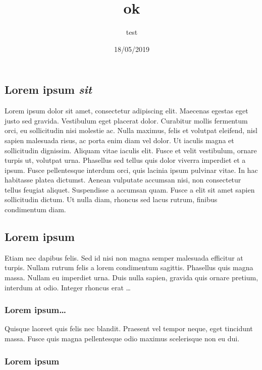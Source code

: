 \author{test}
\title{ok}
\date{18/05/2019}

\begin{pdf}
\maketitle

\section{Lorem ipsum \textit{sit}}

Lorem ipsum dolor sit amet, consectetur adipiscing elit. Maecenas egestas eget justo sed gravida. Vestibulum eget placerat dolor. Curabitur mollis fermentum orci, eu sollicitudin nisi molestie ac. Nulla maximus, felis et volutpat eleifend, nisl sapien malesuada risus, ac porta enim diam vel dolor. Ut iaculis magna et sollicitudin dignissim. Aliquam vitae iaculis elit. Fusce et velit vestibulum, ornare turpis ut, volutpat urna. Phasellus sed tellus quis dolor viverra imperdiet et a ipsum. Fusce pellentesque interdum orci, quis lacinia ipsum pulvinar vitae. In hac habitasse platea dictumst. Aenean vulputate accumsan nisi, non consectetur tellus feugiat aliquet. Suspendisse a accumsan quam. Fusce a elit sit amet sapien sollicitudin dictum. Ut nulla diam, rhoncus sed lacus rutrum, finibus condimentum diam. 

\subsection{Lorem ipsum}

Etiam nec dapibus felis. Sed id nisi non magna semper malesuada efficitur at turpis. Nullam rutrum felis a lorem condimentum sagittis. Phasellus quis magna massa. Nullam eu imperdiet urna. Duis nulla sapien, gravida quis ornare pretium, interdum at odio. Integer rhoncus erat 
\ldots

\subsubsection{Lorem ipsum\ldots}

Quisque laoreet quis felis nec blandit. Praesent vel tempor neque, eget tincidunt massa. Fusce quis magna pellentesque odio maximus scelerisque non eu dui.

\subsubsection{Lorem ipsum}


\end{pdf}
